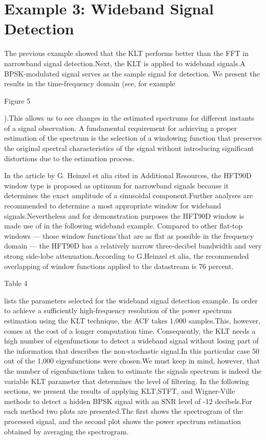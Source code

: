 \documentclass[12pt]{report}
\begin{document}
\section*{Example 3: Wideband Signal Detection}
The previous example showed that the KLT performs better than the FFT in narrowband signal detection.\@ Next, the KLT is applied to wideband signals.\@ A BPSK-modulated signal serves as the sample signal for detection.
We present the results in the time-frequency domain (see, for example \begin{normalsize}\color{red}Figure 5\end{normalsize}).\@ This allows us to see changes in the estimated spectrums for different instants of a signal observation.
A fundamental requirement for achieving a proper estimation of the spectrum is the selection of a windowing function that preserves the original spectral characteristics of the signal without introducing significant distortions due to the estimation process.

In the article by G. Heinzel et alia cited in Additional Resources, the HFT90D window type is proposed as optimum for narrowband signals because it determines the exact amplitude of a sinusoidal component.\@ Further analyses are recommended to determine a most appropriate window for wideband signals.\@ Nevertheless and for demonstration purposes the HFT90D window is made use of in the following wideband example.
Compared to other flat-top windows — those window functions'that are as flat as possible in the frequency domain — the HFT90D has a relatively narrow three-decibel bandwidth and very strong side-lobe attenuation.\@ According to G.\@ Heinzel et alia, the recommended overlapping of window functions applied to the datastream is 76 percent.\ \begin{normalsize}\color{red}Table 4\end{normalsize} lists the parameters selected for the wideband signal detection example.
In order to achieve a sufficiently high-frequency resolution of the power spectrum estimation using the KLT technique, the ACF takes 1,000 samples.\@ This, however, comes at the cost of a longer computation time.
Consequently, the KLT needs a high number of eigenfunctions to detect a wideband signal without losing part of the information that describes the non-stochastic signal.\@ In this particular case 50 out of the 1,000 eigenfunctions were chosen.\@ We must keep in mind, however, that the number of eigenfunctions taken to estimate the signals spectrum is indeed the variable KLT parameter that determines the level of filtering.
In the following sections, we present the results of applying KLT,STFT, and Wigner-Ville methods to detect a hidden BPSK signal with an SNR level of -12 decibels.\@ For each method two plots are presented.\@ The first shows the spectrogram of the processed signal, and the second plot shows the power spectrum estimation obtained by averaging the spectrogram.
\end{document}
